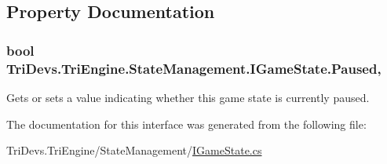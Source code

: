 \subsection{Property Documentation}
\hypertarget{interface_tri_devs_1_1_tri_engine_1_1_state_management_1_1_i_game_state_aed69d2f08c02fbae787f7d8fb41186b8}{
\subsubsection[{Paused}]{\setlength{\rightskip}{0pt plus 5cm}bool Tri\-Devs.\-Tri\-Engine.\-State\-Management.\-I\-Game\-State.\-Paused\hspace{0.3cm}{\ttfamily [get]}, {\ttfamily [set]}}}\label{interface_tri_devs_1_1_tri_engine_1_1_state_management_1_1_i_game_state_aed69d2f08c02fbae787f7d8fb41186b8}


Gets or sets a value indicating whether this game state is currently paused. 



The documentation for this interface was generated from the following file\-:\begin{DoxyCompactItemize}
\item 
Tri\-Devs.\-Tri\-Engine/\-State\-Management/\hyperlink{_i_game_state_8cs}{I\-Game\-State.\-cs}\end{DoxyCompactItemize}
